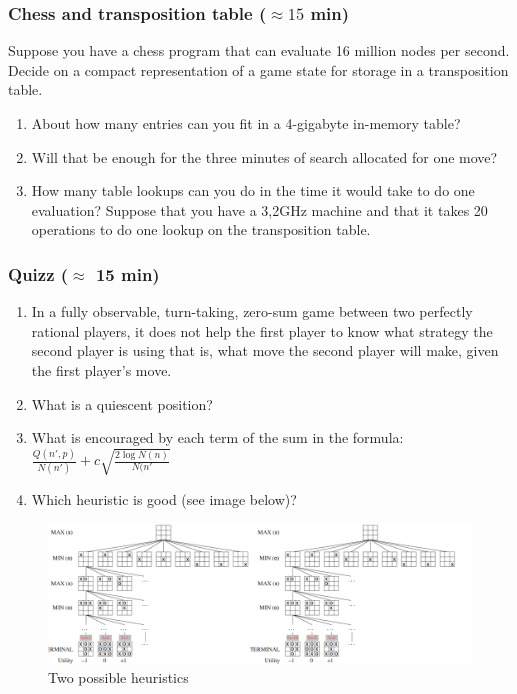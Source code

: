 \documentclass[a4paper, 10pt]{article}
\begin{document}
\subsubsection{Chess and transposition table ($\approx 15$ min)}
Suppose you have a chess program that can evaluate 16 million nodes per second.
Decide on a compact representation of a game state for storage in a transposition table.
\begin{enumerate}
    \item About how many entries can you fit in a 4-gigabyte in-memory table?
    \item Will that be enough for the three minutes of search allocated for one move?
    \item How many table lookups can you do in the time it would take to do one evaluation? Suppose that you have a 3,2GHz machine and that it takes 20 operations to do one lookup on the transposition table.
\end{enumerate}   
   
   \subsubsection{Quizz ($\approx$ 15 min)}
   \begin{enumerate}
       \item In a fully observable, turn-taking, zero-sum game between two perfectly rational players, it does not help the first player to know what strategy the second player is using that is, what move the second player will make, given the first player’s move.
       \item What is a quiescent position?
       \item What is encouraged by each term of the sum in the formula: $\frac{Q(n', p)}{N(n')} + c\sqrt{\frac{2\log N(n)}{N(n'}}$
       \item Which heuristic is good (see image below)?
   \end{enumerate}
   \begin{figure}[H]
       \centering
       \includegraphics[width=1.\textwidth]{figures/trees.png}
       \caption{Two possible heuristics}
       \label{fig:my_label}
   \end{figure}
\end{document}
